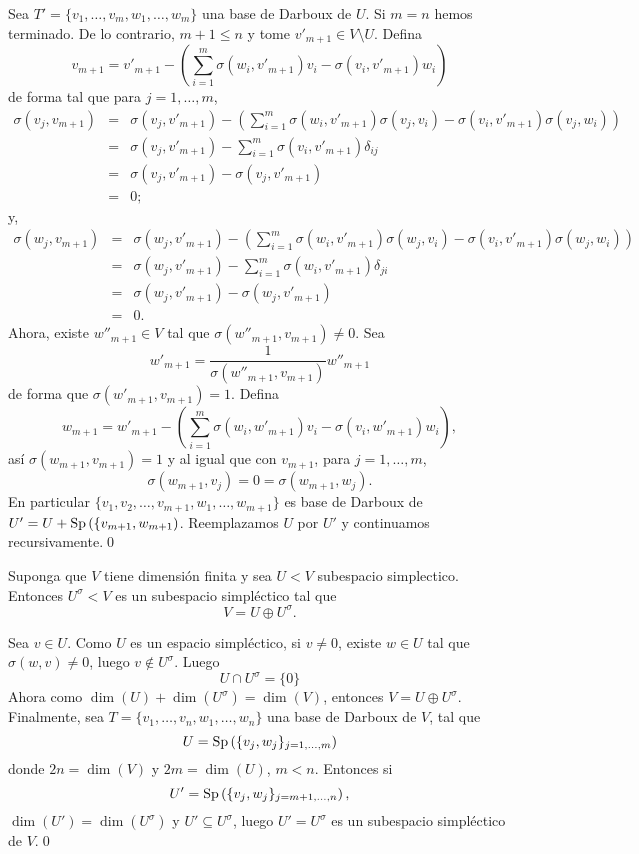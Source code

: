 \dem Sea $T'=\{v_1,\ldots,v_m,w_1,\ldots,w_m\}$ una base de Darboux de $U$. Si $m=n$ hemos terminado. De lo contrario, $m+1\le n$ y tome $v'_{m+1}\in V\setminus U$. Defina
\[
v_{m+1}=v'_{m+1}-\left(\sum_{i=1}^m\sigma(w_i,v'_{m+1})v_i-\sigma(v_i,v'_{m+1})w_i\right)
\]
de forma tal que para $j=1,\ldots,m$,  
\begin{eqnarray*}
\sigma(v_j,v_{m+1}) & = & \sigma(v_j,v'_{m+1})-\left(\sum_{i=1}^m\sigma(w_i,v'_{m+1})\sigma(v_j,v_i)-\sigma(v_i,v'_{m+1})\sigma(v_j,w_i)\right)\\
 & = & \sigma(v_j,v'_{m+1})-\sum_{i=1}^m\sigma(v_i,v'_{m+1})\delta_{ij}\\
 & = & \sigma(v_j,v'_{m+1})-\sigma(v_j,v'_{m+1})\\
 & = & 0;
\end{eqnarray*}
y,
\begin{eqnarray*}
\sigma(w_j,v_{m+1}) & = & \sigma(w_j,v'_{m+1})-\left(\sum_{i=1}^m\sigma(w_i,v'_{m+1})\sigma(w_j,v_i)-\sigma(v_i,v'_{m+1})\sigma(w_j,w_i)\right)\\
 & = & \sigma(w_j,v'_{m+1})-\sum_{i=1}^m\sigma(w_i,v'_{m+1})\delta_{ji}\\
 & = & \sigma(w_j,v'_{m+1})-\sigma(w_j,v'_{m+1})\\
 & = & 0.
\end{eqnarray*}
Ahora, existe $w''_{m+1}\in V$ tal que $\sigma(w''_{m+1},v_{m+1})\ne 0$. Sea
\[
w'_{m+1}=\frac{1}{\sigma(w''_{m+1},v_{m+1})}w''_{m+1}
\]
de forma que $\sigma(w'_{m+1},v_{m+1})=1$. Defina
\[
w_{m+1}=w'_{m+1}-\left(\sum_{i=1}^m\sigma(w_i,w'_{m+1})v_i-\sigma(v_i,w'_{m+1})w_i\right),
\]
as\'i $\sigma(w_{m+1},v_{m+1})=1$ y al igual que con $v_{m+1}$, para $j=1,\ldots,m$,
\[
\sigma(w_{m+1},v_j)=0=\sigma(w_{m+1},w_j).
\]
En particular $\{v_1,v_2,\ldots,v_{m+1},w_1,\ldots,w_{m+1}\}$ es base de Darboux de $U'=U+\operatorname{Sp}\left(\{v_{m+1},w_{m+1}\right)$. Reemplazamos $U$ por $U'$ y continuamos recursivamente.\qed

\begin{pro}
Suponga que $V$ tiene dimensi\'on finita y sea $U<V$ subespacio simplectico. Entonces $U^\sigma<V$ es un subespacio simpl\'ectico tal que
\[
V=U\oplus U^\sigma.
\]
\end{pro}

\dem Sea $v\in U$. Como $U$ es un espacio simpl\'ectico, si $v\ne 0$, existe $w\in U$ tal que $\sigma(w,v)\ne 0$, luego $v\not\in U^\sigma$. Luego
\[
U\cap U^\sigma=\{0\}
\]
Ahora como $\dim(U)+\dim(U^\sigma)=\dim(V)$, entonces $V=U\oplus U^\sigma$. Finalmente, sea $T=\{v_1,\ldots,v_n,w_1,\ldots,w_n\}$ una base de Darboux de $V$, tal que
\[
U=\operatorname{Sp}\left(\{v_j,w_j\}_{j=1,\ldots,m}\right)
\]
donde $2n=\dim(V)$ y $2m=\dim(U)$, $m<n$. Entonces si
\[
U'=\operatorname{Sp}\left(\{v_j,w_j\}_{j=m+1,\ldots,n}\right),
\]
$\dim(U')=\dim(U^\sigma)$ y $U'\subseteq U^\sigma$, luego $U'=U^\sigma$ es un subespacio simpl\'ectico de $V$.\qed


